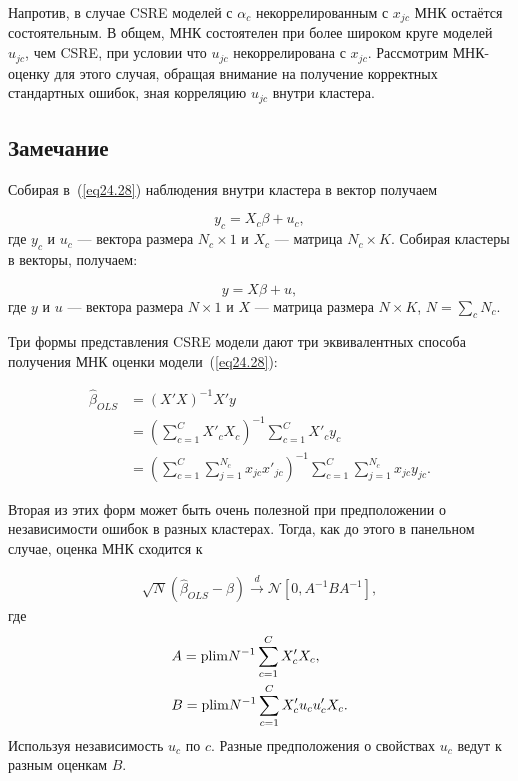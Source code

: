Напротив, в случае CSRE моделей с $\alpha_c$ некоррелированным с $x_{jc}$ МНК остаётся состоятельным. В общем, МНК состоятелен при более широком круге моделей $u_{jc}$, чем CSRE, при условии что $u_{jc}$ некоррелирована с $x_{jc}$. Рассмотрим МНК-оценку для этого случая, обращая внимание на получение корректных стандартных ошибок, зная корреляцию $u_{jc}$ внутри кластера. 

\subsection*{Замечание}

Собирая в~(\ref{eq24.28})  наблюдения внутри кластера в вектор получаем

\begin{equation}
\label{eq24.29}
y_{c} = X_{c} \beta + u_{c},
\end{equation}
где $y_c$ и $u_c$ --- вектора размера $N_c \times 1$ и $X_c$ --- матрица $N_c \times K$. Собирая кластеры в векторы, получаем:

\begin{equation}
\label{eq24.30}
y = X \beta + u,
\end{equation}
где $y$ и $u$ --- вектора размера $N \times 1$ и $X$ --- матрица размера $N \times K$, $N = \sum_c N_c$. 

Три формы представления CSRE модели дают три эквивалентных способа получения МНК оценки модели~(\ref{eq24.28}):

\begin{align}
\label{eq24.31}
 \hat{\beta}_{OLS} &= (X'X)^{-1}X'y \\
&=\left( \sum_{c=1}^C X'_cX_c \right)^{-1}  \sum_{c=1}^C X'_c y_c  \nonumber \\
&=\left( \sum_{c=1}^C \sum_{j=1}^{N_c} x_{jc} x'_{jc} \right)^{-1} \sum_{c=1}^C \sum_{j=1}^{N_c} x_{jc} y_{jc}. \nonumber
\end{align}

Вторая из этих форм может быть очень полезной при предположении о независимости ошибок в разных кластерах. Тогда, как до этого в панельном случае, оценка МНК сходится к

\begin{align}
\label{eq24.32}
\sqrt{N} (\hat{\beta}_{OLS} - \beta) \overset{d}{\to}  \mathcal N [0, A^{-1} B A^{-1}], 
\end{align}
где
\begin{align}
\label{eq24.33}
& A = \mathrm{plim } N^{-1} \sum_{c=1}^C X'_c X_c, \\
& B = \mathrm{plim } N^{-1} \sum_{c=1}^C X'_c u_c u'_c X_c. \nonumber
\end{align}
Используя независимость $u_c$ по $c$. Разные предположения о свойствах $u_c$ ведут к разным оценкам $B$. 

